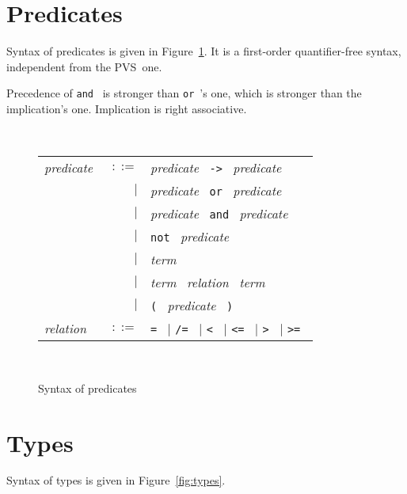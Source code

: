 \documentclass[12pt]{report}
\newcommand{\pvs}{\textsf{PVS}}
\newcommand{\te}[1]{\texttt{#1}~}
\newcommand{\nt}[1]{\textsl{#1}~}
\begin{document}
\section{Predicates}

Syntax of predicates is given in Figure~\ref{fig:predicates}.
It is a first-order quantifier-free syntax, independent from the \pvs\ one.

Precedence of \te{and} is stronger than \te{or}'s one, which is
stronger than the implication's one. Implication is right associative.

\begin{figure}[htbp]
\begin{center}
\hrulefill\\
\begin{tabular}{lrl}
  \nt{predicate}
    & $::=$ & \nt{predicate} \te{->} \nt{predicate} \\
      & $|$ & \nt{predicate} \te{or} \nt{predicate} \\
      & $|$ & \nt{predicate} \te{and} \nt{predicate} \\
      & $|$ & \te{not} \nt{predicate} \\
      & $|$ & \nt{term} \\
      & $|$ & \nt{term} \nt{relation} \nt{term} \\
      & $|$ & \te{(} \nt{predicate} \te{)}
  \\[0.1em]

  \nt{relation}
    & $::=$ & \te{=} $|$ \te{/=} $|$ 
              \te{<} $|$ \te{<=} $|$ \te{>} $|$ \te{>=}
\end{tabular}\\
\hrulefill
\caption{Syntax of predicates}
\label{fig:predicates}
\end{center}		
\end{figure}

\section{Types}

Syntax of types is given in Figure~\ref{fig:types}.
\end{document}
